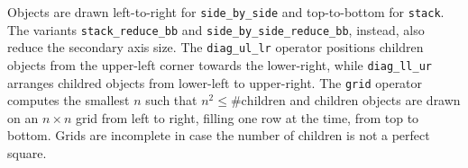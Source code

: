 Objects are drawn left-to-right for \texttt{side\_by\_side} and top-to-bottom for \texttt{stack}.
The variants \texttt{stack\_reduce\_bb} and \texttt{side\_by\_side\_reduce\_bb}, instead, also reduce the secondary axis size. %
%
The \texttt{diag\_ul\_lr} operator positions children objects from the upper-left corner towards the lower-right, while \texttt{diag\_ll\_ur} arranges childred objects from lower-left to upper-right. %
%
The \texttt{grid} operator computes the smallest $n$ such that $n^2 \leq \#\mathrm{children}$ %
and children objects are drawn on an $n \times n$ grid from left to right, filling one row at the time, from top to bottom. Grids are incomplete in case the number of children is not a perfect square.

